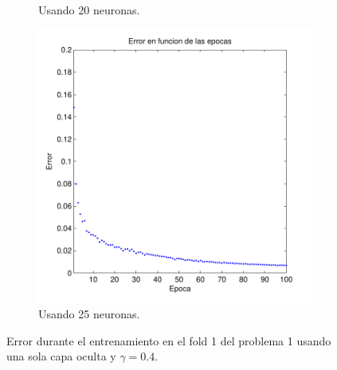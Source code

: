\documentclass[informe.tex]{subfiles}
\begin{document}
\begin{figure}
\begin{subfigure}[b]{0.32\textwidth}
                \caption{Usando 20 neuronas.}
                \label{fig:d1-f1-04-n20}
        \end{subfigure}
        \begin{subfigure}[b]{0.32\textwidth}
                \includegraphics[width=\textwidth]{graficos/error_fold1_25_binary_100_04.pdf}
                \caption{Usando 25 neuronas.}
                \label{fig:d1-f1-04-n25}
        \end{subfigure}
        
        \caption{Error durante el entrenamiento en el fold 1 del problema 1 usando una sola capa oculta y $\gamma=0.4$.}\label{fig:p1-f1-gamma04}
    \end{figure}    
\end{document}
